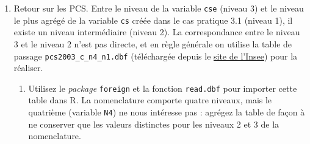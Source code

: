 \documentclass[12pt,twosided, notitlepage]{book}
\newenvironment{Shaded}{}{}
\newcommand{\CommentTok}[1]{\textcolor[rgb]{0.00,0.50,0.00}{#1}}
\newcommand{\DecValTok}[1]{#1}
\newcommand{\KeywordTok}[1]{\textcolor[rgb]{0.00,0.00,1.00}{#1}}
\newcommand{\NormalTok}[1]{#1}
\newcommand{\OperatorTok}[1]{#1}
\newcommand{\StringTok}[1]{\textcolor[rgb]{0.00,0.50,0.50}{#1}}
\renewenvironment{Shaded}{\begin{snugshade}}{\end{snugshade}}
\begin{document}
\begin{enumerate}
\begin{enumerate}
\begin{Shaded}
\end{Shaded}

    \begin{center} \rule{0.5\linewidth}{\linethickness}\end{center} 
     \bigskip 
     \fi
  \end{enumerate}
\item
  Retour sur les PCS. Entre le niveau de la variable \texttt{cse}
  (niveau 3) et le niveau le plus agrégé de la variable \texttt{cs}
  créée dans le cas pratique 3.1 (niveau 1), il existe un niveau
  intermédiaire (niveau 2). La correspondance entre le niveau 3 et le
  niveau 2 n'est pas directe, et en règle générale on utilise la table
  de passage \texttt{pcs2003\_c\_n4\_n1.dbf} (téléchargée depuis le
  \href{https://www.insee.fr/fr/information/2400059}{site de l'Insee})
  pour la réaliser.

  \begin{enumerate}
  \def\labelenumii{\roman{enumii}.}
  \item
    Utilisez le \emph{package} \texttt{foreign} et la fonction
    \texttt{read.dbf} pour importer
    cette table dans R. La nomenclature comporte quatre niveaux, mais le
    quatrième (variable \texttt{N4}) ne nous intéresse pas : agrégez la
    table de façon à ne conserver que les valeurs distinctes pour les
    niveaux 2 et 3 de la nomenclature.


\end{enumerate}
\end{enumerate}
\end{document}
